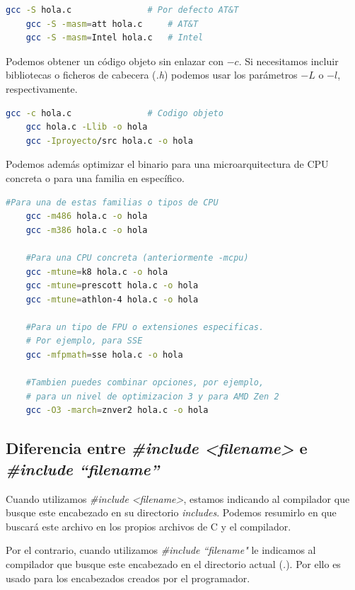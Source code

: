 \documentclass[a4paper, 11pt, titlepage]{article}
\begin{document}
        \begin{lstlisting}[language=bash]
    gcc -S hola.c               # Por defecto AT&T
    gcc -S -masm=att hola.c     # AT&T
    gcc -S -masm=Intel hola.c   # Intel\end{lstlisting}

        Podemos obtener un código objeto sin enlazar con $-c$. Si necesitamos incluir bibliotecas o ficheros de 
        cabecera (\textit{.h}) podemos usar los parámetros $-L$ o $-l$, respectivamente.
         
        \begin{lstlisting}[language=bash]
    gcc -c hola.c               # Codigo objeto
    gcc hola.c -Llib -o hola
    gcc -Iproyecto/src hola.c -o hola\end{lstlisting}

        Podemos además optimizar el binario para una microarquitectura de CPU concreta o para una familia en específico.

        \begin{lstlisting}[language=bash]
    #Para una de estas familias o tipos de CPU
    gcc -m486 hola.c -o hola
    gcc -m386 hola.c -o hola
    
    #Para una CPU concreta (anteriormente -mcpu)
    gcc -mtune=k8 hola.c -o hola
    gcc -mtune=prescott hola.c -o hola
    gcc -mtune=athlon-4 hola.c -o hola
    
    #Para un tipo de FPU o extensiones especificas. 
    # Por ejemplo, para SSE
    gcc -mfpmath=sse hola.c -o hola
    
    #Tambien puedes combinar opciones, por ejemplo, 
    # para un nivel de optimizacion 3 y para AMD Zen 2
    gcc -O3 -march=znver2 hola.c -o hola \end{lstlisting}

    \subsection{Diferencia entre \textit{\#include \textless filename\textgreater} e \textit{\#include ``filename''}}

        Cuando utilizamos \textit{\#include \textless filename\textgreater}, estamos indicando al compilador
        que busque este encabezado en su directorio \textit{includes}. Podemos resumirlo en 
        que buscará este archivo en los propios archivos de C y el compilador.  

        Por el contrario, cuando utilizamos \textit{\#include ``filename"} le indicamos al compilador que busque
        este encabezado en el directorio actual (\textit{.}). Por ello es usado para los encabezados
        creados por el programador.
\end{document}
